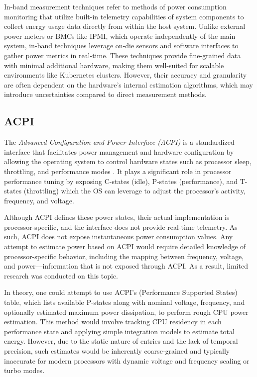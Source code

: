 In-band measurement techniques refer to methods of power consumption monitoring that utilize built-in telemetry capabilities of system components to collect energy usage data directly from within the host system. Unlike external power meters or BMCs like IPMI, which operate independently of the main system, in-band techniques leverage on-die sensors and software interfaces to gather power metrics in real-time. These techniques provide fine-grained data with minimal additional hardware, making them well-suited for scalable environments like Kubernetes clusters. However, their accuracy and granularity are often dependent on the hardware's internal estimation algorithms, which may introduce uncertainties compared to direct measurement methods.

\subsection{ACPI}

The \textit{Advanced Configuration and Power Interface (ACPI)} is a standardized interface that facilitates power management and hardware configuration by allowing the operating system to control hardware states such as processor sleep, throttling, and performance modes \cite{uefi_acpi_6_6}. It plays a significant role in processor performance tuning by exposing C-states (idle), P-states (performance), and T-states (throttling) which the OS can leverage to adjust the processor's activity, frequency, and voltage.

Although ACPI defines these power states, their actual implementation is processor-specific, and the interface does not provide real-time telemetry. As such, ACPI does not expose instantaneous power consumption values. Any attempt to estimate power based on ACPI would require detailed knowledge of processor-specific behavior, including the mapping between frequency, voltage, and power—information that is not exposed through ACPI. As a result, limited research was conducted on this topic.

In theory, one could attempt to use ACPI's  (Performance Supported States) table, which lists available P-states along with nominal voltage, frequency, and optionally estimated maximum power dissipation, to perform rough CPU power estimation. This method would involve tracking CPU residency in each performance state and applying simple integration models to estimate total energy. However, due to the static nature of  entries and the lack of temporal precision, such estimates would be inherently coarse-grained and typically inaccurate for modern processors with dynamic voltage and frequency scaling or turbo modes.

